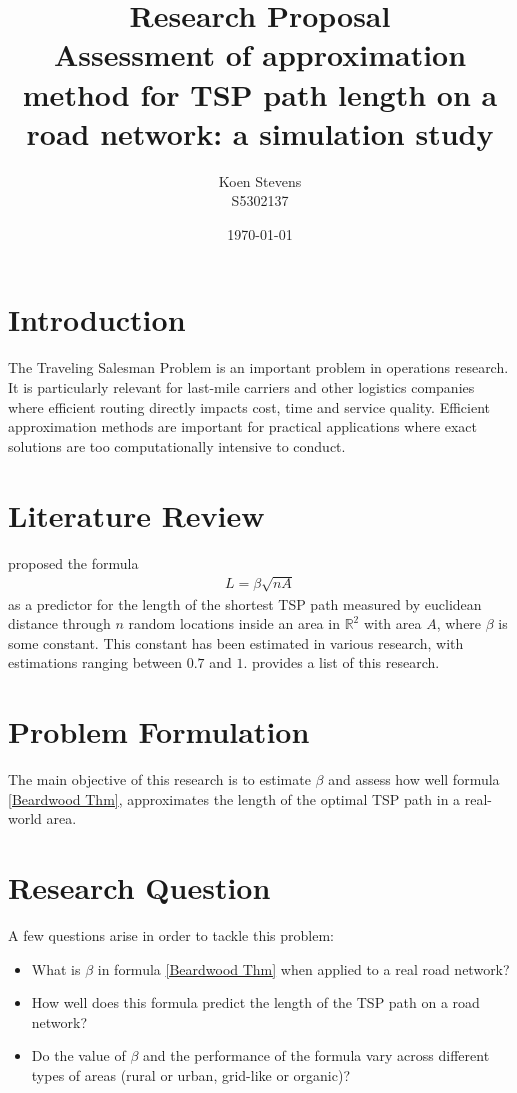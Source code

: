 \documentclass[a4paper,11pt]{article}
\title{Research Proposal\\
Assessment of approximation method for TSP path length on a road network: a simulation study}
\author{Koen Stevens\\
        S5302137}
\date{\today}
\newcommand{\1}[1]{\,I_{#1}} %
\begin{document}
\maketitle
\section{Introduction}
The Traveling Salesman Problem is an important problem in operations research. It is particularly relevant for last-mile carriers and other logistics companies where efficient routing directly impacts cost, time and service quality. Efficient approximation methods are important for practical applications where exact solutions are too computationally intensive to conduct. 
\section{Literature Review}
\cite{beardwood1959shortest} proposed the formula
\begin{align}
    L=\beta\sqrt{nA}
    \label{Beardwood Thm}
\end{align}
as a predictor for the length of the shortest TSP path measured by euclidean distance through $n$ random locations inside an area in $\mathbb{R}^2$ with area $A$, where $\beta$ is some constant. This constant has been estimated in various research, with estimations ranging between $0.7$ and $1$. \cite{doi:10.1177/03611981211049433} provides a list of this research.
\section{Problem Formulation}
The main objective of this research is to estimate $\beta$ and assess how well formula \ref{Beardwood Thm}, approximates the length of the optimal TSP path in a real-world area.
\section{Research Question}
A few questions arise in order to tackle this problem:
\begin{itemize}
    \item What is $\beta$ in formula \ref{Beardwood Thm} when applied to a real road network?
    \item How well does this formula predict the length of the TSP path on a road network?
    \item Do the value of $\beta$ and the performance of the formula vary across different types of areas (rural or urban, grid-like or organic)?
\end{itemize}
\end{document}
